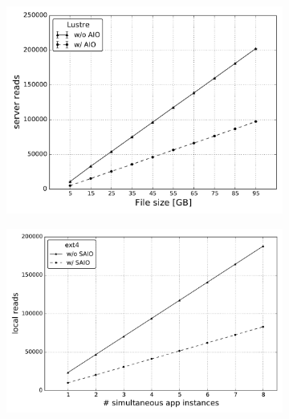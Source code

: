 \begin{figure}[!htb]
\begin{subfigure}[t]{0.32\textwidth}
    \centering
    \includegraphics[width=\textwidth]{chapters/chapter2/figures/SC2015/ROOT/separate_plots/test_cluster/Lustre/server_reads}
    \caption{\textit{}}
    \label{figure: lustre_3}
  \end{subfigure}
  \begin{subfigure}[b]{0.32\textwidth}
    \centering
    \includegraphics[width=\textwidth]{chapters/chapter2/figures/SC2015/ROOT/cluster/multiple_instances/reads_simult_instance_ext4_test_cluster}
    \caption{\textit{}}
    \label{figure: ext4_4}
  \end{subfigure}
  \begin{subfigure}[b]{0.32\textwidth}
    \centering

\end{subfigure}
\end{figure}
